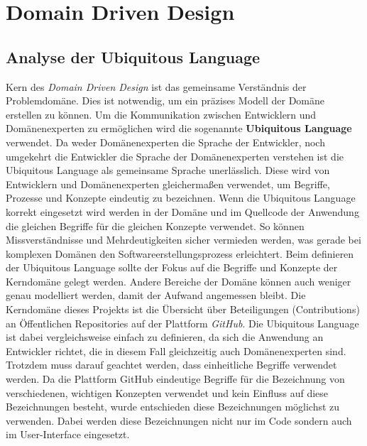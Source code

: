 \chapter{Domain Driven Design}

\section{Analyse der Ubiquitous Language}
\label{sec:ubiq_lang}

Kern des \textit{Domain Driven Design} ist das gemeinsame Verständnis der Problemdomäne. Dies ist notwendig, um ein präzises Modell der Domäne erstellen zu können.
Um die Kommunikation zwischen Entwicklern und Domänenexperten zu ermöglichen wird die sogenannte \textbf{Ubiquitous  Language} verwendet.
Da weder Domänenexperten die Sprache der Entwickler, noch umgekehrt die Entwickler die Sprache der Domänenexperten verstehen ist die Ubiquitous Language als gemeinsame Sprache unerlässlich.
Diese wird von Entwicklern und Domänenexperten gleichermaßen verwendet, um Begriffe, Prozesse und Konzepte eindeutig zu bezeichnen.
Wenn die Ubiquitous Language korrekt eingesetzt wird werden in der Domäne und im Quellcode der Anwendung die gleichen Begriffe für die gleichen Konzepte verwendet.
So können Missverständnisse und Mehrdeutigkeiten sicher vermieden werden, was gerade bei komplexen Domänen den Softwareerstellungsprozess erleichtert.
Beim definieren der Ubiquitous Language sollte der Fokus auf die Begriffe und Konzepte der Kerndomäne gelegt werden.
Andere Bereiche der Domäne können auch weniger genau modelliert werden, damit der Aufwand angemessen bleibt.
\newline
\newline
Die Kerndomäne dieses Projekts ist die Übersicht über Beteiligungen (Contributions) an Öffentlichen Repositories auf der Plattform \textit{GitHub}.
Die Ubiquitous Language ist dabei vergleichsweise einfach zu definieren, da sich die Anwendung an Entwickler richtet, die in diesem Fall gleichzeitig auch Domänenexperten sind.
Trotzdem muss darauf geachtet werden, dass einheitliche Begriffe verwendet werden.
Da die Plattform GitHub eindeutige Begriffe für die Bezeichnung von verschiedenen, wichtigen Konzepten verwendet und kein Einfluss auf diese Bezeichnungen besteht, wurde entschieden diese Bezeichnungen möglichst zu verwenden. Dabei werden diese Bezeichnungen nicht nur im Code sondern auch im User-Interface eingesetzt.

